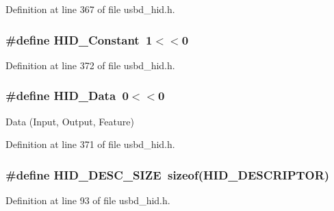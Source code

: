 Definition at line 367 of file usbd\+\_\+hid.\+h.

\subsubsection[{\texorpdfstring{H\+I\+D\+\_\+\+Constant}{HID_Constant}}]{\setlength{\rightskip}{0pt plus 5cm}\#define H\+I\+D\+\_\+\+Constant~1$<$$<$0}\hypertarget{group__USBD__HID_gaf565fe0a22495869e02aa47c45389eae}{}\label{group__USBD__HID_gaf565fe0a22495869e02aa47c45389eae}


Definition at line 372 of file usbd\+\_\+hid.\+h.

\subsubsection[{\texorpdfstring{H\+I\+D\+\_\+\+Data}{HID_Data}}]{\setlength{\rightskip}{0pt plus 5cm}\#define H\+I\+D\+\_\+\+Data~0$<$$<$0}\hypertarget{group__USBD__HID_ga6fdf3aabdbd36deecb675ec299911862}{}\label{group__USBD__HID_ga6fdf3aabdbd36deecb675ec299911862}
Data (Input, Output, Feature) 

Definition at line 371 of file usbd\+\_\+hid.\+h.

\subsubsection[{\texorpdfstring{H\+I\+D\+\_\+\+D\+E\+S\+C\+\_\+\+S\+I\+ZE}{HID_DESC_SIZE}}]{\setlength{\rightskip}{0pt plus 5cm}\#define H\+I\+D\+\_\+\+D\+E\+S\+C\+\_\+\+S\+I\+ZE~sizeof({\bf H\+I\+D\+\_\+\+D\+E\+S\+C\+R\+I\+P\+T\+OR})}\hypertarget{group__USBD__HID_ga5ff0f82d743784b185a3a82a726733d9}{}\label{group__USBD__HID_ga5ff0f82d743784b185a3a82a726733d9}


Definition at line 93 of file usbd\+\_\+hid.\+h.

